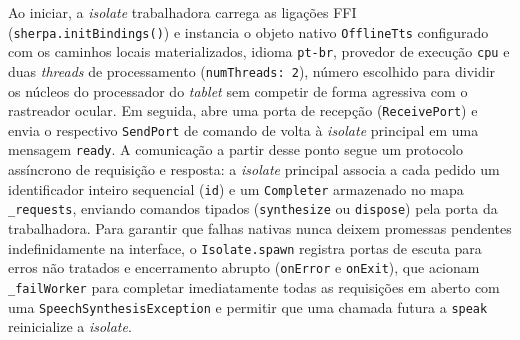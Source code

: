 Ao iniciar, a \textit{isolate} trabalhadora carrega as ligações FFI (\texttt{sherpa.initBindings()}) e instancia o objeto nativo \texttt{OfflineTts} configurado com os caminhos locais materializados, idioma \texttt{pt-br}, provedor de execução \texttt{cpu} e duas \textit{threads} de processamento (\texttt{numThreads: 2}), número escolhido para dividir os núcleos do processador do \textit{tablet} sem competir de forma agressiva com o rastreador ocular. Em seguida, abre uma porta de recepção (\texttt{ReceivePort}) e envia o respectivo \texttt{SendPort} de comando de volta à \textit{isolate} principal em uma mensagem \texttt{ready}. A comunicação a partir desse ponto segue um protocolo assíncrono de requisição e resposta: a \textit{isolate} principal associa a cada pedido um identificador inteiro sequencial (\texttt{id}) e um \texttt{Completer} armazenado no mapa \texttt{\_requests}, enviando comandos tipados (\texttt{synthesize} ou \texttt{dispose}) pela porta da trabalhadora. Para garantir que falhas nativas nunca deixem promessas pendentes indefinidamente na interface, o \texttt{Isolate.spawn} registra portas de escuta para erros não tratados e encerramento abrupto (\texttt{onError} e \texttt{onExit}), que acionam \texttt{\_failWorker} para completar imediatamente todas as requisições em aberto com uma \texttt{SpeechSynthesisException} e permitir que uma chamada futura a \texttt{speak} reinicialize a \textit{isolate}.

